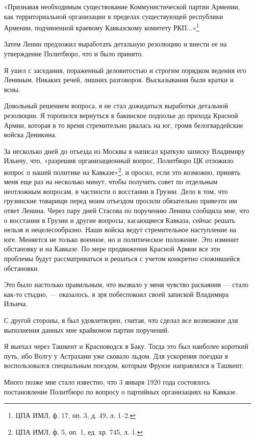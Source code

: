 \documentclass[12pt, a4paper, openany]{book}
\begin{document}
«Признавая необходимым существование Коммунистической партии Армении, как территориальной организации в пределах существующей республики Армении, подчиненной краевому Кавказскому комитету РКП...»\footnote{ЦПА ИМЛ, ф. 17, оп. 3, д. 49, л. 1–2.}

Затем Ленин предложил выработать детальную резолюцию и внести ее на утверждение Политбюро, что и было принято.

Я ушел с заседания, пораженный деловитостью и строгим порядком ведения его Лениным. Никаких речей, лишних разговоров. Высказывания были кратки и ясны.

Довольный решением вопроса, я не стал дожидаться выработки детальной резолюции. Я торопился вернуться в бакинское подполье до прихода Красной Армии, которая в то время стремительно рвалась на юг, громя белогвардейские войска Деникина.

За несколько дней до отъезда из Москвы я написал краткую записку Владимиру Ильичу, что, «разрешив организационный вопрос, Политбюро ЦК отложило вопрос о нашей политике на Кавказе»\footnote{ЦПА ИМЛ, ф. 5, оп. 1, ед. хр. 745, л. 1.}, и просил, если это возможно, принять меня еще раз на несколько минут, чтобы получить совет по отдельным неотложным вопросам, в частности о восстании в Грузии. Дело в том, что грузинские товарищи перед моим отъездом просили обязательно привезти им ответ Ленина. Через пару дней Стасова по поручению Ленина сообщила мне, что о восстании в Грузии и другие вопросы, касающиеся Кавказа, сейчас решать нельзя и нецелесообразно. Наши войска ведут стремительное наступление на юге. Меняется не только военное, но и политическое положение. Это изменит обстановку и на Кавказе. По мере продвижения Красной Армии все эти проблемы будут рассматриваться и решаться с учетом конкретно сложившейся обстановки.

Это было настолько правильным, что вызвало у меня чувство раскаяния — стало как-то стыдно, — оказалось, я зря побеспокоил своей запиской Владимира Ильича.

С другой стороны, я был удовлетворен, считая, что сделал все возможное для выполнения данных мне крайкомом партии поручений.

Я выехал через Ташкент и Красноводск в Баку. Тогда это был наиболее короткий путь, ибо Волгу у Астрахани уже сковало льдом. Для ускорения поездки я воспользовался специальным поездом, которым Фрунзе направлялся в Ташкент.

Много позже мне стало известно, что 3 января 1920 года состоялось постановление Политбюро по вопросу о партийных организациях на Кавказе.
\end{document}
